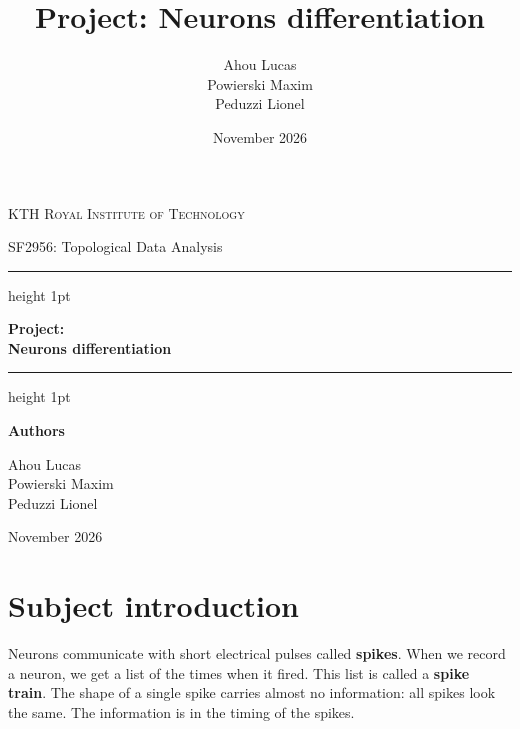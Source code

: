 \documentclass[11pt,a4paper]{article}
\title{Project: Neurons differentiation}
\author{Ahou Lucas\\Powierski Maxim\\Peduzzi Lionel}
\date{November 2026}
\begin{document}
\begin{titlepage}
    \thispagestyle{empty}
    \centering
    \vspace*{2cm}

    {\large \textsc{KTH Royal Institute of Technology}\par}
    \vspace{0.5cm}
    {\large SF2956: Topological Data Analysis\par}

    \vspace{2.5cm}
    \hrule height 1pt
    \vspace{0.8cm}
    {\Huge \bfseries Project:\\[0.3em] Neurons differentiation\par}
    \vspace{0.8cm}
    \hrule height 1pt

    \vspace{3cm}
    {\large \textbf{Authors}\par}
    \vspace{0.4cm}
    {\large
    Ahou Lucas\\[0.2em]
    Powierski Maxim\\[0.2em]
    Peduzzi Lionel\par}

    \vfill
    {\large November 2026\par}
    \vspace{1cm}
\end{titlepage}

\setcounter{page}{1}
\tableofcontents
\clearpage

\setcounter{page}{1}

\section{Subject introduction}

Neurons communicate with short electrical pulses called \textbf{spikes}. When we record a neuron, we get a list of the times when it fired. This list is called a \textbf{spike train}. The shape of a single spike carries almost no information: all spikes look the same. The information is in the timing of the spikes.
\end{document}
